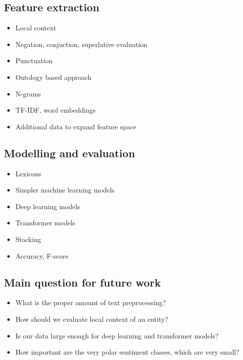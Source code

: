 \documentclass[11pt,a4paper]{article}
\begin{document}
\subsection{Feature extraction}
\begin{itemize}
  \item Local context
  \item Negation, conjuction, superlative evaluation
  \item Punctuation
  \item Ontology based approach
  \item N-grams
  \item TF-IDF, word embeddings
  \item Additional data to expand feature space
\end{itemize}

\subsection{Modelling and evaluation}
\begin{itemize}
  \item Lexicons
  \item Simpler machine learning models
  \item Deep learning models
  \item Transformer models
  \item Stacking
  \item Accuracy, F-score
\end{itemize}

\subsection{Main question for future work}
\begin{itemize}
  \item What is the proper amount of text preprocessing?
  \item How should we evaluate local context of an entity?
  \item Is our data large enough for deep learning and transformer models?
  \item How important are the very polar sentiment classes, which are very small?
\end{itemize}




\end{document}
